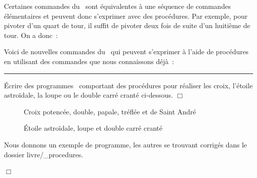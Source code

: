 Certaines commandes du \robot\ sont équivalentes à une séquence
de commandes élémentaires et peuvent donc s'exprimer avec des procédures.
Par exemple, pour pivoter d'un quart de tour, il suffit de pivoter deux fois
de suite d'un huitième de tour. On a donc~:

\noindent Voici de nouvelles commandes du \robot\ qui peuvent s'exprimer à l'aide de
procédures en utilisant des commandes que nous connaissons déjà~:

\noindent\rule{137mm}{0.1mm} %
\begin{exercices}{
Écrire des programmes \python\ comportant des pro\-cé\-du\-res pour 
réaliser les croix,
l'étoile astroïdale, la loupe ou le double carré cranté
ci-dessous.
\noindent $\Box$}\end{exercices}
\begin{figure}[htbp]
 \vspace{-\baselineskip}
 \caption{Croix potencée, double, papale, tréflée et de Saint André}
\end{figure}
\begin{figure}[htbp]
 \caption{Étoile astroïdale, loupe et double carré cranté}
\end{figure}

\clearpage

\begin{corrige}{
Nous donnons un exemple de programme, les
autres se trouvant corrigés dans le dossier {\idt livre/\_procedures}.

\noindent $\Box$}\end{corrige}

\vfill

